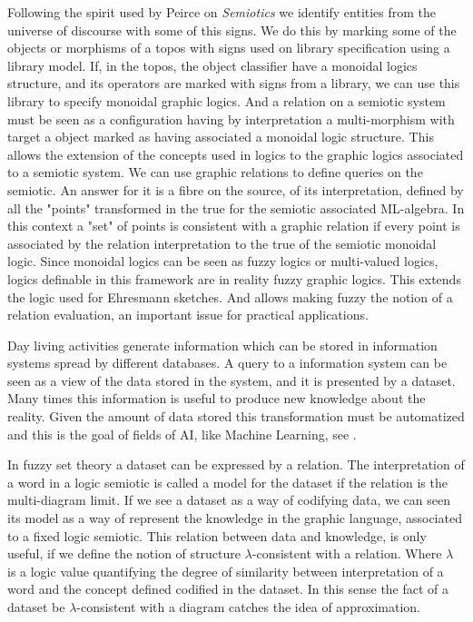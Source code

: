 \documentclass[oribibl]{llncs}
\begin{document}
Following the spirit used by Peirce on \emph{Semiotics} we identify entities from the universe of discourse with some of this signs. We do this
by marking some of the objects or morphisms of a topos with
signs used on library specification using a library model. If, in the topos, the object classifier have a monoidal logics structure, and its operators are marked with signs from a library, we can use this library to specify monoidal
graphic logics. And a relation on a semiotic system must be seen as a
configuration having by interpretation a multi-morphism with target
a object marked as having associated a monoidal logic structure.
This allows the extension of the concepts used in logics to the
graphic logics associated to a semiotic system. We can use graphic
relations to define queries on the semiotic. An answer for it is a
fibre on the source, of its interpretation, defined by all the
"points" transformed in the true for the semiotic associated
ML-algebra. In this context a "set" of points is consistent with a
graphic relation if every point is associated by the relation
interpretation to the true of the semiotic monoidal logic. Since
monoidal logics can be seen as fuzzy logics or multi-valued logics,
logics definable in this framework are in reality fuzzy graphic
logics. This extends the logic used for Ehresmann sketches. And
allows making fuzzy the notion of a relation evaluation, an
important issue for practical applications.

Day living activities generate information which can be stored in information systems spread by different databases.  A query to a information system can be seen as a view of the data stored in the system, and it is presented by a dataset. Many times this information is useful to produce new knowledge about the reality. Given the amount of data stored this transformation must be automatized and this is the goal of fields of AI, like Machine Learning, see \cite{Michell86}.

In fuzzy set theory a dataset can be expressed by a relation. The interpretation of a word in a logic semiotic is called a model for the dataset if the relation is the multi-diagram limit. If we see a dataset as a way of codifying data, we can seen its model as a way of represent the knowledge in the graphic language, associated to a fixed logic semiotic. This relation between data and knowledge, is only useful, if we define the notion of structure $\lambda$-consistent with a relation. Where $\lambda$ is a logic value quantifying the degree of similarity between interpretation of a word and the concept defined codified in the dataset. In this sense the fact of a dataset be $\lambda$-consistent with a diagram catches the idea of approximation.
\end{document}
